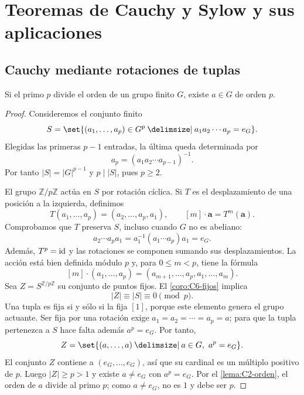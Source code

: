 \section{Teoremas de Cauchy y Sylow y sus aplicaciones}\label{sec:grupos-sylow}

\subsection{Cauchy mediante rotaciones de tuplas}\label{tema:6-3-2}
\begin{teo}[Cauchy]\label{teo:C6-cauchy}
Si el primo $p$ divide el orden de un grupo finito $G$, existe $a\in G$ de orden $p$.
\end{teo}
\begin{proof}
Consideremos el conjunto finito
\[
S=\set{(a_1,\ldots,a_p)\in G^p\given a_1a_2\cdots a_p=e_G}.
\]
Elegidas las primeras $p-1$ entradas, la última queda determinada por
\[
a_p=(a_1a_2\cdots a_{p-1})^{-1}.
\]
Por tanto $|S|=|G|^{p-1}$ y $p\mid|S|$, pues $p\ge2$.

El grupo $\mathbb Z/p\mathbb Z$ actúa en $S$ por rotación cíclica. Si $T$ es el desplazamiento de una posición a la izquierda, definimos
\[
T(a_1,\ldots,a_p)=(a_2,\ldots,a_p,a_1),\qquad
[m]\cdot\mathbf a=T^m(\mathbf a).
\]
Comprobamos que $T$ preserva $S$, incluso cuando $G$ no es abeliano:
\[
a_2\cdots a_pa_1=a_1^{-1}(a_1\cdots a_p)a_1=e_G.
\]
Además, $T^p=\operatorname{id}$ y las rotaciones se componen sumando sus desplazamientos. La acción está bien definida módulo $p$ y, para $0\le m<p$, tiene la fórmula
\[
[m]\cdot(a_1,\ldots,a_p)
=(a_{m+1},\ldots,a_p,a_1,\ldots,a_m).
\]
Sea $Z=S^{\mathbb Z/p\mathbb Z}$ su conjunto de puntos fijos. El \cref{coro:C6-fijos} implica
\[
|Z|\equiv|S|\equiv0\pmod p.
\]
Una tupla es fija si y sólo si la fija $[1]$, porque este elemento genera el grupo actuante. Ser fija por una rotación exige $a_1=a_2=\cdots=a_p=a$; para que la tupla pertenezca a $S$ hace falta además $a^p=e_G$. Por tanto,
\[
Z=\set{(a,\ldots,a)\given a\in G,\ a^p=e_G}.
\]
El conjunto $Z$ contiene a $(e_G,\ldots,e_G)$, así que su cardinal es un múltiplo positivo de $p$. Luego $|Z|\ge p>1$ y existe $a\ne e_G$ con $a^p=e_G$. Por el \cref{lema:C2-orden}, el orden de $a$ divide al primo $p$; como $a\ne e_G$, no es $1$ y debe ser $p$.
\end{proof}

